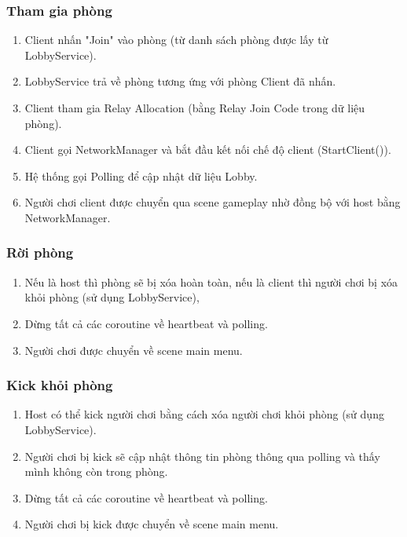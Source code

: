 \subsubsection{Tham gia phòng}
    \begin{enumerate}[-]
        \item Client nhấn "Join" vào phòng (từ danh sách phòng được lấy từ LobbyService).
        \item LobbyService trả về phòng tương ứng với phòng Client đã nhấn.
        \item Client tham gia Relay Allocation (bằng Relay Join Code trong dữ liệu phòng).
        \item Client gọi NetworkManager và bắt đầu kết nối chế độ client (StartClient()).
        \item Hệ thống gọi Polling để cập nhật dữ liệu Lobby.
        \item Người chơi client được chuyển qua scene gameplay nhờ đồng bộ với host bằng NetworkManager.
    \end{enumerate}
    
\subsubsection{Rời phòng}
    \begin{enumerate}[-]
        \item Nếu là host thì phòng sẽ bị xóa hoàn toàn, nếu là client thì người chơi bị xóa khỏi phòng (sử dụng LobbyService),
        \item Dừng tất cả các coroutine về heartbeat và polling.
        \item Người chơi được chuyển về scene main menu.
    \end{enumerate}
    
\subsubsection{Kick khỏi phòng}
    \begin{enumerate}[-]
        \item Host có thể kick người chơi bằng cách xóa người chơi khỏi phòng (sử dụng LobbyService).
        \item Người chơi bị kick sẽ cập nhật thông tin phòng thông qua polling và thấy mình không còn trong phòng.
        \item Dừng tất cả các coroutine về heartbeat và polling.
        \item Người chơi bị kick được chuyển về scene main menu.
    \end{enumerate}
    
